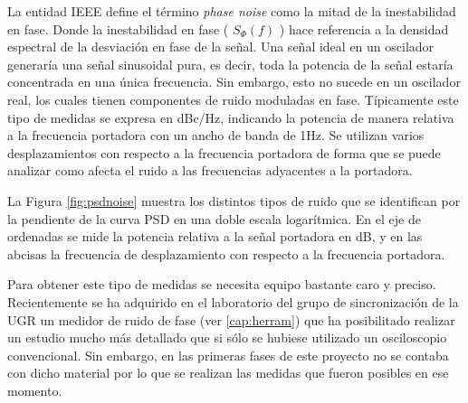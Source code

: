 La entidad IEEE define el término \textit{phase noise} \cite{ieeephysdefs} como 
la mitad 
de la inestabilidad en fase. Donde la inestabilidad en fase ( $S_{\Phi} (f)$ ) 
hace referencia a la densidad espectral de la desviación en fase de la señal. 
Una señal ideal en un oscilador generaría una señal sinusoidal pura, es decir, 
toda la potencia de la señal estaría concentrada en una única frecuencia. Sin 
embargo, esto no sucede en un oscilador real, los cuales tienen componentes de 
ruido moduladas en fase. Típicamente este tipo de medidas se expresa en dBc/Hz, 
indicando la potencia de manera relativa a la frecuencia portadora con un ancho 
de banda de 1Hz. Se utilizan varios desplazamientos con respecto a la 
frecuencia portadora de forma que se puede analizar como afecta el ruido a las 
frecuencias adyacentes a la portadora.

La Figura \ref{fig:psdnoise} muestra los distintos tipos de ruido que se 
identifican por la pendiente de la curva PSD en una doble escala logarítmica. 
En el eje de ordenadas se mide la potencia relativa a la señal portadora en dB, 
y en las abcisas la frecuencia de desplazamiento con respecto a la frecuencia 
portadora. 

Para obtener este tipo de medidas se necesita equipo bastante caro y preciso. 
Recientemente se ha adquirido en el laboratorio del grupo de sincronización de 
la UGR un medidor de ruido de fase (ver \ref{cap:herram}) que ha posibilitado 
realizar un estudio mucho más detallado que si sólo se hubiese utilizado un 
osciloscopio convencional. Sin embargo, en las primeras fases de este proyecto 
no se contaba con dicho material por lo que se realizan las medidas que fueron 
posibles en ese momento.


